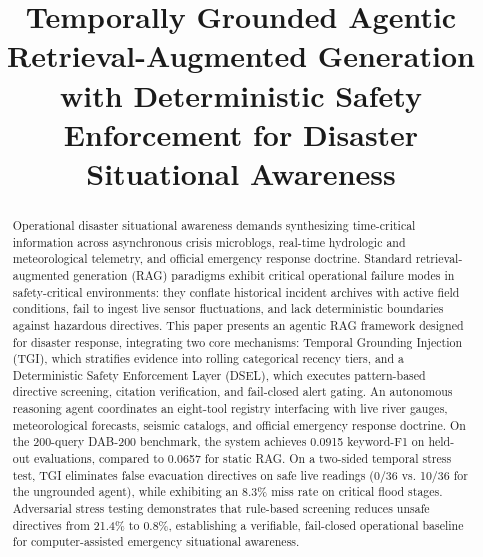 \documentclass[conference]{IEEEtran}
\begin{document}
\title{Temporally Grounded Agentic Retrieval-Augmented Generation with Deterministic Safety Enforcement for Disaster Situational Awareness}

\author{
}

\maketitle

\begin{abstract}
Operational disaster situational awareness demands synthesizing time-critical information across asynchronous crisis microblogs, real-time hydrologic and meteorological telemetry, and official emergency response doctrine. Standard retrieval-augmented generation (RAG) paradigms exhibit critical operational failure modes in safety-critical environments: they conflate historical incident archives with active field conditions, fail to ingest live sensor fluctuations, and lack deterministic boundaries against hazardous directives. This paper presents an agentic RAG framework designed for disaster response, integrating two core mechanisms: Temporal Grounding Injection (TGI), which stratifies evidence into rolling categorical recency tiers, and a Deterministic Safety Enforcement Layer (DSEL), which executes pattern-based directive screening, citation verification, and fail-closed alert gating. An autonomous reasoning agent coordinates an eight-tool registry interfacing with live river gauges, meteorological forecasts, seismic catalogs, and official emergency response doctrine. On the 200-query DAB-200 benchmark, the system achieves 0.0915 keyword-F1 on held-out evaluations, compared to 0.0657 for static RAG. On a two-sided temporal stress test, TGI eliminates false evacuation directives on safe live readings (0/36 vs. 10/36 for the ungrounded agent), while exhibiting an 8.3\% miss rate on critical flood stages. Adversarial stress testing demonstrates that rule-based screening reduces unsafe directives from 21.4\% to 0.8\%, establishing a verifiable, fail-closed operational baseline for computer-assisted emergency situational awareness.
\end{abstract}
\end{document}
